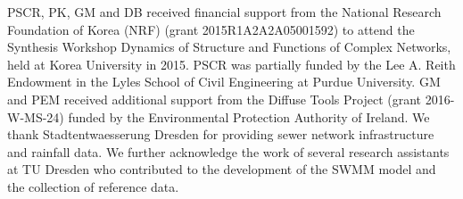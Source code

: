 \documentclass{agujournal2018}
\begin{document}
\acknowledgments
PSCR, PK, GM and DB received f\/inancial support from the National Research Foundation of Korea (NRF) (grant 2015R1A2A2A05001592) to attend the Synthesis Workshop Dynamics of Structure and Functions of Complex Networks, held at Korea University in 2015. PSCR was partially funded by the Lee A. Reith Endowment in the Lyles School of Civil Engineering at Purdue University. GM and PEM received additional support from the Dif\/fuse Tools Project (grant 2016-W-MS-24) funded by the Environmental Protection Authority of Ireland. We thank Stadtentwaesserung Dresden for providing sewer network infrastructure and rainfall data. We further acknowledge the work of several research assistants at TU Dresden who contributed to the development of the SWMM model and the collection of reference data.


%
% 
%





\end{document}
